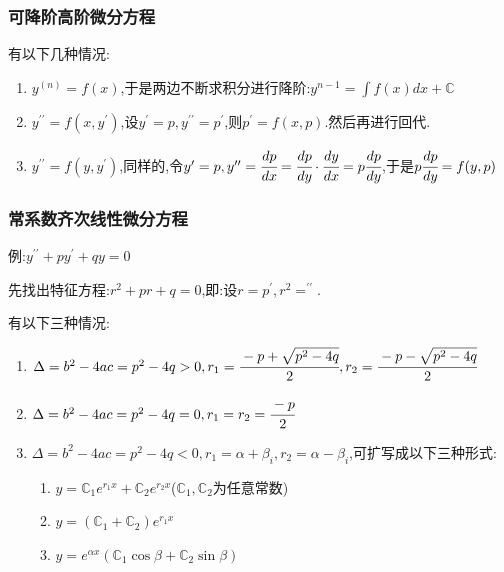 \documentclass[UTF8,12pt]{ctexbook}
\newcommand{\derivative}{^\prime}
\newcommand{\doubleDerivative}{^{\prime\prime}}
\newcommand{\defFunction}[1]{f(#1)}
\newcommand{\mathConstant}{\mathbb{C}}
\begin{document}
{{{{}%

\subsubsection{可降阶高阶微分方程}{
  有以下几种情况:

  \begin{enumerate}
    \item $y^{(n)} = \defFunction{x}$,于是两边不断求积分进行降阶:$y^{n-1} = \int \defFunction{x}dx + \mathConstant$
    \item $y\doubleDerivative = \defFunction{x,y\derivative}$,设$y\derivative = p,y\doubleDerivative = p\derivative$,则$p\derivative = \defFunction{x,p}$.然后再进行回代.
    \item $y\doubleDerivative = \defFunction{y,y\derivative}$,同样的,令$y\derivative = p, y\doubleDerivative = \cfrac{dp}{dx} = \cfrac{dp}{dy}\cdot\cfrac{dy}{dx} = p\cfrac{dp}{dy}$,于是$p\cfrac{dp}{dy} = \defFunction{y,p}$
  \end{enumerate}

}%

\subsubsection{常系数齐次线性微分方程}{
  例:$y\doubleDerivative + py\derivative + qy = 0$

  先找出特征方程:$r^2 + pr + q = 0$,即:设$r = p\derivative,r^2 = \doubleDerivative$.

  有以下三种情况:
  \begin{enumerate}
    \item $\Delta = b^2 - 4ac = p^2 - 4q > 0,r_1 = \cfrac{-p + \sqrt{p^2 - 4q}}{2}, r_2 = \cfrac{-p - \sqrt{p^2 - 4q}}{2}$
    \item $\Delta = b^2 - 4ac = p^2 - 4q = 0,r_1 = r_2 = \cfrac{-p}{2}$
    \item {$\Delta = b^2 - 4ac = p^2 - 4q < 0,r_1 = \alpha + \beta_i, r_2 = \alpha - \beta_i$,可扩写成以下三种形式:

          \begin{enumerate}
            \item $y = \mathConstant_1e^{r_1x} + \mathConstant_2e^{r_2x}$($\mathConstant_1,\mathConstant_2$为任意常数)
            \item $y = (\mathConstant_1 + \mathConstant_2)e^{r_1x}$
            \item $y = e^{\alpha x}(\mathConstant_1\cos\beta + \mathConstant_2\sin\beta)$
          \end{enumerate}
          }
  \end{enumerate}

}}}}
\end{document}
